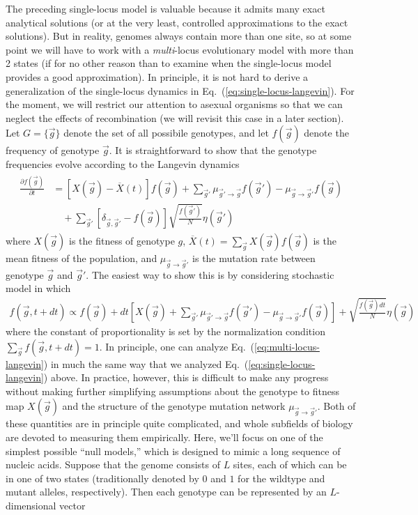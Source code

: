 \documentclass[11pt]{article}
\newcommand{\eq}[1]{Eq.~(\ref{#1})}
\begin{document}
The preceding single-locus model is valuable because it admits many exact analytical solutions (or at the very least, controlled approximations to the exact solutions). But in reality, genomes always contain more than one site, so at some point we will have to work with a \emph{multi}-locus evolutionary model with more than 2 states (if for no other reason than to examine when the single-locus model provides a good approximation). In principle, it is not hard to derive a generalization of the single-locus dynamics in \eq{eq:single-locus-langevin}. For the moment, we will restrict our attention to asexual organisms so that we can neglect the effects of recombination (we will revisit this case in a later section). Let $G = \{ \vec{g} \}$ denote the set of all possibile genotypes, and let $f(\vec{g})$ denote the frequency of genotype $\vec{g}$. It is straightforward to show that the genotype frequencies evolve according to the Langevin dynamics
\begin{align}
\label{eq:multi-locus-langevin}
\begin{aligned}
\frac{\partial f(\vec{g})}{\partial t} & = \left[ X(\vec{g}) - \overline{X}(t) \right] f(\vec{g}) + \sum_{\vec{g}'} \mu_{\vec{g}' \to \vec{g}} f(\vec{g}') - \mu_{\vec{g} \to \vec{g}'} f(\vec{g}) \\
	& \quad + \sum_{\vec{g}'} \left[ \delta_{\vec{g},\vec{g}'} - f(\vec{g}) \right] \sqrt{\frac{f(\vec{g}')}{N}} \eta(\vec{g}') 
\end{aligned}
\end{align}
where $X(\vec{g})$ is the fitness of genotype $g$, $\overline{X}(t) = \sum_{\vec{g}} X(\vec{g}) f(\vec{g})$ is the mean fitness of the population, and $\mu_{\vec{g} \to \vec{g}'}$ is the mutation rate between genotype $\vec{g}$ and $\vec{g}'$. The easiest way to show this is by considering stochastic model in which
\begin{align}
f(\vec{g},t+dt) \propto f(\vec{g}) + dt \left[ X(\vec{g}) + \sum_{\vec{g}'} \mu_{\vec{g}' \to \vec{g}} f(\vec{g}') - \mu_{\vec{g} \to \vec{g}'} f(\vec{g}) \right] + \sqrt{\frac{f(\vec{g}) dt}{N}} \eta(\vec{g}) 
\end{align}
where the constant of proportionality is set by the normalization condition $\sum_{\vec{g}} f(\vec{g},t+dt) = 1$. In principle, one can analyze \eq{eq:multi-locus-langevin} in much the same way that we analyzed \eq{eq:single-locus-langevin} above. In practice, however, this is difficult to make any progress without making further simplifying assumptions about the genotype to fitness map $X(\vec{g})$ and the structure of the genotype mutation network $\mu_{\vec{g} \to \vec{g}'}$. Both of these quantities are in principle quite complicated, and whole subfields of biology are devoted to measuring them empirically. Here, we'll focus on one of the simplest possible ``null models,'' which is designed to mimic a long sequence of nucleic acids. Suppose that the genome consists of $L$ sites, each of which can be in one of two states (traditionally denoted by $0$ and $1$ for the wildtype and mutant alleles, respectively). Then each genotype can be represented by an $L$-dimensional vector
\end{document}
